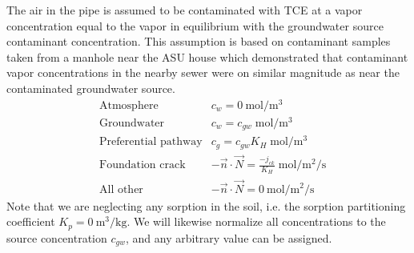 The air in the pipe is assumed to be contaminated with TCE at a vapor concentration equal to the vapor in equilibrium with the groundwater source contaminant concentration.
This assumption is based on contaminant samples taken from a manhole near the ASU house\cite{guo_vapor_2015} which demonstrated that contaminant vapor concentrations in the nearby sewer were on similar magnitude as near the contaminated groundwater source.
\begin{align*}
  &\text{Atmosphere} & c_w = \SI{0}{\mol\per\metre\cubed} \\
  &\text{Groundwater} & c_w = c_{gw} \; \si{\mol\per\metre\cubed} \\
  &\text{Preferential pathway} & c_g = c_{gw} K_H \; \si{\mol\per\metre\cubed} \\
  &\text{Foundation crack} & -\vec{n} \cdot \vec{N} = \frac{-j_{ck}}{K_H} \; \si{\mol\per\metre\squared\per\second}\\
  &\text{All other} & -\vec{n} \cdot \vec{N} = \SI{0}{\mol\per\metre\squared\per\second}
\end{align*}
Note that we are neglecting any sorption in the soil, i.e. the sorption partitioning coefficient $K_p = \SI{0}{\metre\cubed\per\kilo\gram}$.
We will likewise normalize all concentrations to the source concentration $c_{gw}$, and any arbitrary value can be assigned.\par

